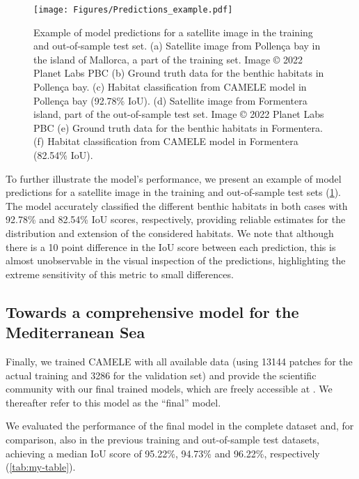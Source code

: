 \begin{figure}[H]
    \centering
    \texttt{[image: Figures/Predictions\_example.pdf]}
    \caption[Example of model predictions for a satellite image in the training
        and out-of-sample test set]{Example of model predictions for a
        satellite
        image in the training
        and out-of-sample test set. (a) Satellite image from Pollença bay in
        the island of Mallorca, a part of the training set. Image © 2022 Planet
        Labs PBC (b) Ground truth
        data for the benthic habitats in Pollença bay. (c) Habitat
        classification from CAMELE model in Pollença bay (92.78\% IoU). (d)
        Satellite image from Formentera island, part of the out-of-sample test
        set. Image © 2022 Planet
        Labs PBC (e) Ground truth data for the benthic habitats in Formentera.
        (f)
        Habitat classification from CAMELE model in Formentera (82.54\% IoU).}
    \label{fig:example_prediction}
\end{figure}

To further illustrate the model's performance, we present an example of model
predictions for a satellite image in the training and out-of-sample test sets
(\cref{fig:example_prediction}). The model accurately classified the different
benthic habitats in both cases with 92.78\% and 82.54\% IoU scores,
respectively, providing reliable estimates for the distribution and extension
of the considered habitats. We note that although there is a 10 point
difference in the IoU score between each prediction, this is almost
unobservable in the visual inspection of the predictions, highlighting the
extreme sensitivity of this metric to small differences.

\subsection{Towards a comprehensive model for the Mediterranean Sea}

Finally, we trained CAMELE with all available data (using 13144 patches for the
actual training and 3286 for the validation set) and provide the scientific
community with our final trained models, which are freely accessible at
\cite{GimenezRomero_zenodo}. We thereafter refer to this model as the ``final''
model.

We evaluated the performance of the final model in the
complete dataset and, for comparison, also in the previous training and
out-of-sample test datasets, achieving a median IoU score of 95.22\%, 94.73\%
and 96.22\%, respectively (\cref{tab:my-table}).

